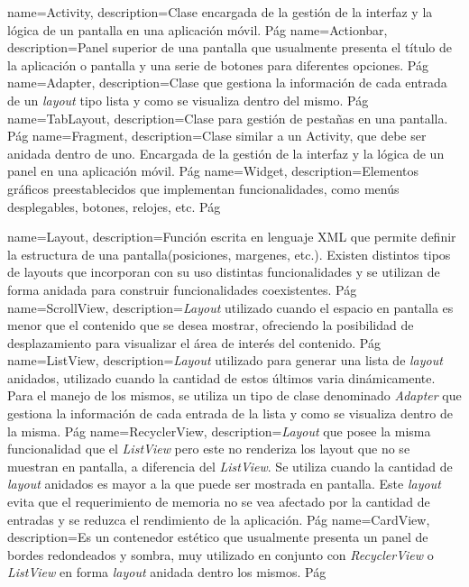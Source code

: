 {
    name=Activity,
    description={Clase encargada de la gestión de la interfaz y la lógica de un pantalla en una aplicación móvil. Pág}
}
{
    name=Actionbar,
    description={Panel superior de una pantalla que usualmente presenta el título de la aplicación o pantalla y una serie de botones para diferentes opciones. Pág}
}
{
    name=Adapter,
    description={Clase que gestiona la información de cada entrada de un \textit{layout} tipo lista y como se visualiza dentro del mismo. Pág}
}
{
    name=TabLayout,
    description={Clase para gestión de pestañas en una pantalla. Pág}
}
{
    name=Fragment,
    description={Clase similar a un Activity, que debe ser anidada dentro de uno. Encargada de la gestión de la interfaz y la lógica de un panel en una aplicación móvil. Pág}
}
{
    name=Widget,
    description={Elementos gráficos preestablecidos que implementan funcionalidades, como menús desplegables, botones, relojes, etc. Pág}
}


{
    name=Layout,
    description={Función escrita en lenguaje XML que permite definir la estructura de una pantalla(posiciones, margenes, etc.). Existen distintos tipos de layouts que incorporan con su uso distintas funcionalidades y se utilizan de forma anidada para construir funcionalidades coexistentes. Pág}
}
{
    name=ScrollView,
    description={\textit{Layout} utilizado cuando el espacio en pantalla es menor que el contenido que se desea mostrar, ofreciendo la posibilidad de desplazamiento para visualizar el área de interés del contenido. Pág}
}
{
    name=ListView,
    description={\textit{Layout} utilizado para generar una lista de \textit{layout} anidados, utilizado cuando la cantidad de estos últimos varia dinámicamente. Para el manejo de los mismos, se utiliza un tipo de clase denominado \textit{Adapter} que gestiona la información de cada entrada de la lista y como se visualiza dentro de la misma. Pág}
}
{
    name=RecyclerView,
    description={\textit{Layout} que posee la misma funcionalidad que el \textit{ListView} pero este no renderiza los layout que no se muestran en pantalla, a diferencia del \textit{ListView}. Se utiliza cuando la cantidad de \textit{layout} anidados es mayor a la que puede ser mostrada en pantalla. Este \textit{layout} evita que el requerimiento de memoria no se vea afectado por la cantidad de entradas y se reduzca el rendimiento de la aplicación. Pág}
}
{
    name=CardView,
    description={Es un contenedor estético que usualmente presenta un panel de bordes redondeados y sombra, muy utilizado en conjunto con \textit{RecyclerView} o \textit{ListView} en forma \textit{layout} anidada dentro los mismos. Pág}
}

